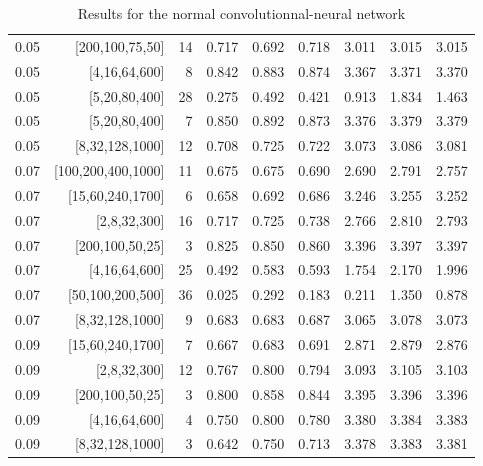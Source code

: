 \begin{table}[f]
\begin{tabular}{@{}rrrrrrrrr@{}}
0.05 & {[}200,100,75,50{]} & 14 & 0.717 & 0.692 & 0.718 & 3.011 & 3.015 & 3.015 \\
0.05 & {[}4,16,64,600{]} & 8 & 0.842 & 0.883 & 0.874 & 3.367 & 3.371 & 3.370 \\
0.05 & {[}5,20,80,400{]} & 28 & 0.275 & 0.492 & 0.421 & 0.913 & 1.834 & 1.463 \\
0.05 & {[}5,20,80,400{]} & 7 & 0.850 & 0.892 & 0.873 & 3.376 & 3.379 & 3.379 \\
0.05 & {[}8,32,128,1000{]} & 12 & 0.708 & 0.725 & 0.722 & 3.073 & 3.086 & 3.081 \\
0.07 & {[}100,200,400,1000{]} & 11 & 0.675 & 0.675 & 0.690 & 2.690 & 2.791 & 2.757 \\
0.07 & {[}15,60,240,1700{]} & 6 & 0.658 & 0.692 & 0.686 & 3.246 & 3.255 & 3.252 \\
0.07 & {[}2,8,32,300{]} & 16 & 0.717 & 0.725 & 0.738 & 2.766 & 2.810 & 2.793 \\
0.07 & {[}200,100,50,25{]} & 3 & 0.825 & 0.850 & 0.860 & 3.396 & 3.397 & 3.397 \\
0.07 & {[}4,16,64,600{]} & 25 & 0.492 & 0.583 & 0.593 & 1.754 & 2.170 & 1.996 \\
0.07 & {[}50,100,200,500{]} & 36 & 0.025 & 0.292 & 0.183 & 0.211 & 1.350 & 0.878 \\
0.07 & {[}8,32,128,1000{]} & 9 & 0.683 & 0.683 & 0.687 & 3.065 & 3.078 & 3.073 \\
0.09 & {[}15,60,240,1700{]} & 7 & 0.667 & 0.683 & 0.691 & 2.871 & 2.879 & 2.876 \\
0.09 & {[}2,8,32,300{]} & 12 & 0.767 & 0.800 & 0.794 & 3.093 & 3.105 & 3.103 \\
0.09 & {[}200,100,50,25{]} & 3 & 0.800 & 0.858 & 0.844 & 3.395 & 3.396 & 3.396 \\
0.09 & {[}4,16,64,600{]} & 4 & 0.750 & 0.800 & 0.780 & 3.380 & 3.384 & 3.383 \\
0.09 & {[}8,32,128,1000{]} & 3 & 0.642 & 0.750 & 0.713 & 3.378 & 3.383 & 3.381 \\ \bottomrule
\end{tabular}
\caption{Results for the normal convolutionnal-neural network}
\label{tab:cnn}
\end{table}



